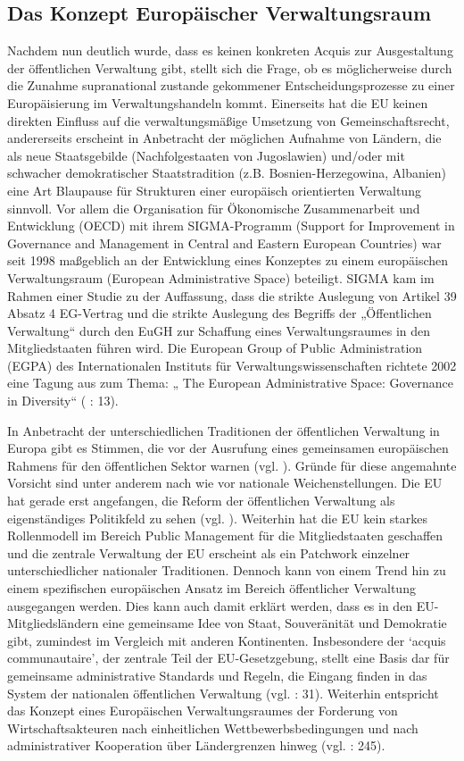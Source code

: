 \subsection{Das Konzept Europäischer Verwaltungsraum}
\label{subsec:Verwaltungsraum}
Nachdem nun deutlich wurde, dass es keinen konkreten Acquis zur Ausgestaltung der öffentlichen Verwaltung gibt, stellt sich die Frage, ob es möglicherweise durch die Zunahme supranational zustande gekommener Entscheidungsprozesse zu einer Europäisierung im Verwaltungshandeln kommt. Einerseits hat die EU keinen direkten Einfluss auf die verwaltungsmäßige Umsetzung von Gemeinschaftsrecht, andererseits erscheint in Anbetracht der möglichen Aufnahme von Ländern, die als neue Staatsgebilde (Nachfolgestaaten von Jugoslawien) und/oder mit schwacher demokratischer Staatstradition (z.B. Bosnien-Herzegowina, Albanien) eine Art Blaupause für Strukturen einer europäisch orientierten Verwaltung sinnvoll. Vor allem die Organisation für Ökonomische Zusammenarbeit und Entwicklung (OECD) mit ihrem SIGMA-Programm (Support for Improvement in Governance and Management in Central and Eastern European Countries) war seit 1998 maßgeblich an der Entwicklung eines Konzeptes zu einem europäischen Verwaltungsraum (European Administrative Space) beteiligt. SIGMA kam im Rahmen einer Studie zu der Auffassung, dass die strikte Auslegung von Artikel 39 Absatz 4 EG-Vertrag und die strikte Auslegung des Begriffs der „Öffentlichen Verwaltung“ durch den EuGH zur Schaffung eines Verwaltungsraumes in den Mitgliedstaaten führen wird. Die European Group of Public Administration (EGPA) des Internationalen Instituts für Verwaltungswissenschaften richtete 2002 eine Tagung aus zum Thema: „ The European Administrative Space: Governance in Diversity“ (\cite{mangenot} : 13).\par
In Anbetracht der unterschiedlichen Traditionen der öffentlichen Verwaltung in Europa gibt es Stimmen, die vor der Ausrufung eines gemeinsamen europäischen Rahmens für den öffentlichen Sektor warnen (vgl. \cite{olsen}). Gründe für diese angemahnte Vorsicht sind unter anderem nach wie vor nationale Weichenstellungen. Die EU hat gerade erst angefangen, die Reform der öffentlichen Verwaltung als eigenständiges Politikfeld zu sehen (vgl. \cite{schmar}). Weiterhin hat die EU kein starkes Rollenmodell im Bereich Public Management für die Mitgliedstaaten geschaffen und die zentrale Verwaltung der EU erscheint als ein Patchwork einzelner unterschiedlicher nationaler Traditionen. Dennoch kann von einem Trend hin zu einem spezifischen europäischen Ansatz im Bereich öffentlicher Verwaltung ausgegangen werden. Dies kann auch damit erklärt werden, dass es in den EU-Mitgliedsländern eine gemeinsame Idee von Staat, Souveränität und Demokratie gibt, zumindest im Vergleich mit anderen Kontinenten. Insbesondere der ‘acquis communautaire’, der zentrale Teil der EU-Gesetzgebung, stellt eine Basis dar für gemeinsame administrative Standards und Regeln, die Eingang finden in das System der nationalen öffentlichen Verwaltung (vgl. \cite{raarut} : 31). Weiterhin entspricht das Konzept eines Europäischen Verwaltungsraumes der Forderung von Wirtschaftsakteuren nach einheitlichen Wettbewerbsbedingungen und nach administrativer Kooperation über Ländergrenzen hinweg (vgl. \cite{bogjan} : 245). \par
